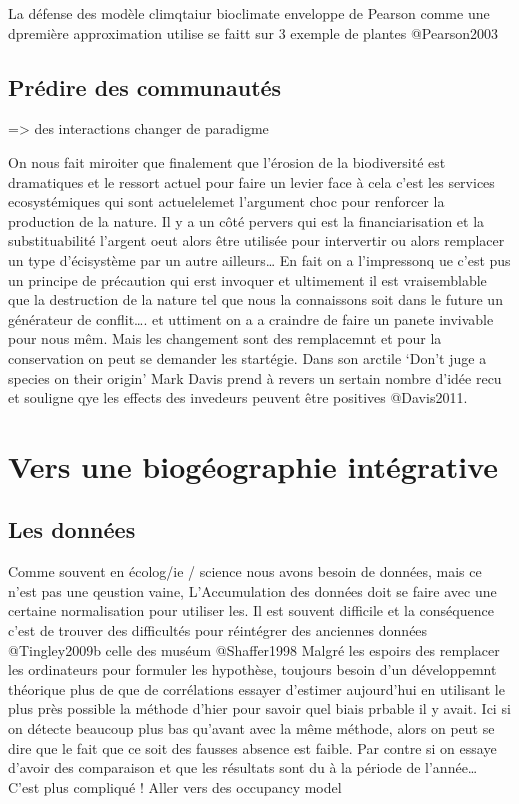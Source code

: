 La défense des modèle climqtaiur bioclimate enveloppe de Pearson comme
une dpremière approximation utilise se faitt sur 3 exemple de plantes
@Pearson2003

\subsection{Prédire des
communautés}\label{pruxe9dire-des-communautuxe9s}

=\textgreater{} des interactions changer de paradigme

On nous fait miroiter que finalement que l'érosion de la biodiversité
est dramatiques et le ressort actuel pour faire un levier face à cela
c'est les services ecosystémiques qui sont actuelelemet l'argument choc
pour renforcer la production de la nature. Il y a un côté pervers qui
est la financiarisation et la substituabilité l'argent oeut alors être
utilisée pour intervertir ou alors remplacer un type d'écisystème par un
autre ailleurs\ldots{} En fait on a l'impressonq ue c'est pus un
principe de précaution qui erst invoquer et ultimement il est
vraisemblable que la destruction de la nature tel que nous la
connaissons soit dans le future un générateur de conflit\ldots{}. et
uttiment on a a craindre de faire un panete invivable pour nous mêm.
Mais les changement sont des remplacemnt et pour la conservation on peut
se demander les startégie. Dans son arctile `Don't juge a species on
their origin' Mark Davis prend à revers un sertain nombre d'idée recu et
souligne qye les effects des invedeurs peuvent être positives
@Davis2011.

\section*{Vers une biogéographie
intégrative}\label{vers-une-bioguxe9ographie-intuxe9grative}

\subsection{Les données}\label{les-donnuxe9es}

Comme souvent en écolog/ie / science nous avons besoin de données, mais
ce n'est pas une qeustion vaine, L'Accumulation des données doit se
faire avec une certaine normalisation pour utiliser les. Il est souvent
difficile et la conséquence c'est de trouver des difficultés pour
réintégrer des anciennes données @Tingley2009b celle des muséum
@Shaffer1998 Malgré les espoirs des remplacer les ordinateurs pour
formuler les hypothèse, toujours besoin d'un développemnt théorique plus
de que de corrélations essayer d'estimer aujourd'hui en utilisant le
plus près possible la méthode d'hier pour savoir quel biais prbable il y
avait. Ici si on détecte beaucoup plus bas qu'avant avec la même
méthode, alors on peut se dire que le fait que ce soit des fausses
absence est faible. Par contre si on essaye d'avoir des comparaison et
que les résultats sont du à la période de l'année\ldots{} C'est plus
compliqué ! Aller vers des occupancy model

